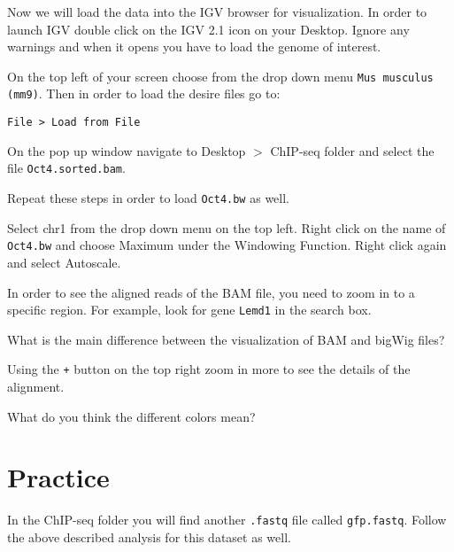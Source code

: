 \begin{steps}
Now we will load the data into the IGV browser for visualization. In order to
launch IGV double click on the IGV 2.1 icon on your Desktop. Ignore any warnings
and when it opens you have to load the genome of interest.

On the top left of your screen choose from the drop down menu \texttt{Mus musculus
(mm9)}. Then in order to load the desire files go to:

\begin{lstlisting}
File > Load from File
\end{lstlisting}

On the pop up window navigate to Desktop $>$ ChIP-seq folder and select the file
\texttt{Oct4.sorted.bam}.

Repeat these steps in order to load \texttt{Oct4.bw} as well.

Select chr1 from the drop down menu on the top left. Right click on the name of
\texttt{Oct4.bw} and choose Maximum under the Windowing Function. Right click again and
select Autoscale.

In order to see the aligned reads of the BAM file, you need to zoom in to a
specific region. For example, look for gene \texttt{Lemd1} in the search box.
\end{steps}

\begin{questions}
What is the main difference between the visualization of BAM and bigWig files?
\begin{answer}
\end{answer}
\end{questions}

Using the \texttt{+} button on the top right zoom in more to see the details of the alignment.

\begin{questions}
What do you think the different colors mean?
\begin{answer}
\end{answer}
\end{questions}

\section{Practice}
In the ChIP-seq folder you will find another \texttt{.fastq} file called
\texttt{gfp.fastq}. Follow the above described analysis for this dataset as well.

